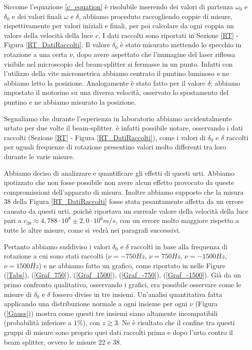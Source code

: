 \documentclass{article}
\begin{document}
Siccome l'equazione \ref{c_equation} è risolubile inserendo dei valori di partenza $\omega_0$ e $\delta_0$ e dei valori finali $\omega$ e $\delta$, abbiamo proceduto
raccogliendo coppie di misure, rispettivamente per valori iniziali e finali, per poi calcolare da ogni coppia un valore della velocità della luce $c$. I dati raccolti
sono riportati in Sezione \ref{RT} - Figura \ref{RT_DatiRaccolti}.
Il valore $\delta_0$ è stato misurato mettendo lo specchio in rotazione a una certa $\nu$, dopo avere aspettato che l'immagine del laser riflessa visibile nel microscopio
del beam-splitter si fermasse in un punto. Infatti con l'utilizzo della vite micrometrica abbiamo centrato il puntino luminoso e ne abbiamo letto la posizione.
Analogamente è stato fatto per il valore $\delta$: abbiamo impostato il motorino su una diversa velocità, osservato lo spostamento del puntino e ne abbiamo misurato la
posizione.

Segnaliamo che durante l'esperienza in laboratorio abbiamo accidentalmente urtato per due volte il beam-splitter. è infatti possibile notare, osservando i dati raccolti 
(Sezione \ref{RT} - Figura \ref{RT_DatiRaccolti}), come i valori di $\delta_0$ e $\delta$ raccolti per uguali frequenze di rotazione presentino valori molto differenti 
tra loro durante le varie misure.

Abbiamo deciso di analizzare e quantificare gli effetti di questi urti. Abbiamo ipotizzato che non fosse possibile non avere alcun effetto provocato da queste compromissioni
dell'apparato di misura. Inoltre abbiamo supposto che la misura 38 della Figura \ref{RT_DatiRaccolti} fosse stata pesantamente affetta da un errore causato da questi urti,
poichè riportava un surreale valore della velocità della luce pari a $c_{38}\approx 4,788 \cdot10^8 \pm 2,0 \cdot10^6 m/s$, con un errore molto maggiore rispetto a tutte le altre misure,
come si vedrà nei paragrafi successivi. 

Pertanto abbiamo suddiviso i valori $\delta_0$ e $\delta$ raccolti in base alla frequenza di rotazione a cui sono stati raccolti ($\nu=-750Hz$, $\nu=750Hz$, 
$\nu=-1500Hz$, $\nu=1500Hz$) e ne abbiamo fatto un grafico, come riportato in nelle Figure (\ref{Tabs}), (\ref{Graf_750}), (\ref{Graf_1500}), (\ref{Graf_-750}), 
(\ref{Graf_-1500}). 
Già da un primo confronto qualitativo, osservando i grafici, era possibile osservare come le misure di $\delta_0$ e $\delta$ fossero divise in tre insiemi. Un'analisi 
quantitativa fatta applicando una distribuzione normale a ogni insieme per ogni $\nu$ (Figura (\ref{Gauss})) mostra come questi tre insiemi siano altamente incompatibili
(probabilità inferiore a $1\%$), con $z\gtrsim 3$. 
Ne è risultato che il confine tra questi gruppi di misure sono proprio quei dati raccolti prima e dopo l'urto contro il beam splitter, ovvero le misure 22 e 38.
\end{document}

